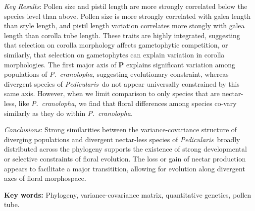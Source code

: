 \documentclass[12pt,letterpaper]{article}
\def\PC{\emph{P.~cranolopha}}
\def\P{\emph{Pedicularis}}
\begin{document}
\begin{itemize}
{\item \emph{Key Results}: Pollen size and pistil length are more strongly correlated below the species level than above. Pollen size is more strongly correlated with galea length than style length, and pistil length variation correlates more stongly with galea length than corolla tube length. These traits are highly integrated, suggesting that selection on corolla morphology affects gametophytic competition, or similarly, that selection on gametophytes can explain variation in corolla morphologies. The first major axis of {\bf P} explains significant variation among populations of \PC, suggesting evolutionary constraint, whereas divergent species of \P~do not appear universally constrained by this same axis. However, when we limit comparison to only species that are nectar-less, like \PC, we find that floral differences among species co-vary similarly as they do within \PC. 

\item \emph{Conclusions}: Strong similarities between the variance-covariance structure of diverging populations and divergent nectar-less species of \P~broadly distributed across the phylogeny supports the existence of strong developmental or selective constraints of floral evolution. The loss or gain of nectar production appears to facilitate a major transitition, allowing for evolution along divergent axes of floral morphospace. 
}
\end{itemize}

{\bf Key words:} Phylogeny, variance-covariance matrix, quantitative genetics, pollen tube.

\bigskip
\bigskip


\noindent 
\end{document}
